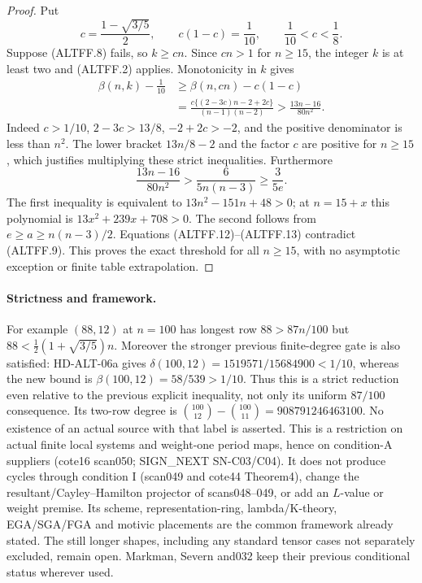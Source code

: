 \begin{proof}
Put
\[
 c=\frac{1-\sqrt{3/5}}2,
 \qquad c(1-c)=\frac1{10},\qquad \frac1{10}<c<\frac18.
 \tag{ALTFF.11}
\]
Suppose (ALTFF.8) fails, so $k\ge cn$.
Since $cn>1$ for $n\ge15$, the integer $k$ is at least two and
(ALTFF.2) applies. Monotonicity in $k$ gives
\[
 \begin{split}
 \beta(n,k)-\frac1{10}
 &\ge\beta(n,cn)-c(1-c)\\
 &=\frac{c\{(2-3c)n-2+2c\}}{(n-1)(n-2)}
   >\frac{13n-16}{80n^2}.
 \end{split}
 \tag{ALTFF.12}
\]
Indeed $c>1/10$, $2-3c>13/8$, $-2+2c>-2$, and the positive
denominator is less than $n^2$. The lower bracket $13n/8-2$ and the factor $c$ are positive
for $n\ge15$, which justifies multiplying these strict inequalities.
Furthermore
\[
 \frac{13n-16}{80n^2}
       >\frac6{5n(n-3)}\ge\frac3{5e}.
 \tag{ALTFF.13}
\]
The first inequality is equivalent to
$13n^2-151n+48>0$; at $n=15+x$ this polynomial is
$13x^2+239x+708>0$. The second follows from
$e\ge a\ge n(n-3)/2$. Equations (ALTFF.12)--(ALTFF.13)
contradict (ALTFF.9). This proves the exact threshold for all
$n\ge15$, with no asymptotic exception or finite table extrapolation.
\end{proof}

\paragraph{Strictness and framework.}
For example $(88,12)$ at $n=100$ has longest row $88>87n/100$
but $88<\tfrac12(1+\sqrt{3/5})n$. Moreover the stronger previous
finite-degree gate is also satisfied: HD-ALT-06a gives
$\delta(100,12)=1519571/15684900<1/10$, whereas the new bound is
$\beta(100,12)=58/539>1/10$. Thus this is a strict reduction even
relative to the previous explicit inequality, not only its uniform
$87/100$ consequence. Its two-row degree is
$\binom{100}{12}-\binom{100}{11}=908791246463100$.
No existence of an actual source with that label is asserted.
This is a restriction on actual finite local systems and weight-one
period maps, hence on condition-A suppliers (cote16 scan050;
SIGN\_NEXT SN-C03/C04). It does not produce cycles through condition I
(scan049 and cote44 Theorem4), change the resultant/Cayley--Hamilton
projector of scans048--049, or add an $L$-value or weight premise.
Its scheme, representation-ring, lambda/K-theory, EGA/SGA/FGA and
motivic placements are the common framework already stated.
The still longer shapes, including any standard tensor cases not
separately excluded, remain open. Markman, Severn and032 keep their
previous conditional status wherever used.

